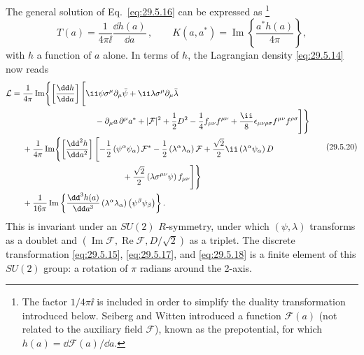 The general solution of Eq.~\eqref{eq:29.5.16} can be expressed as
\footnote{The factor \(1/4\pi \ii\) is included in order to simplify the
duality transformation introduced below. Seiberg and Witten introduced a
function \(\mathcal{F}(a)\) (not related to the auxiliary field
\(\mathcal{F}\)), known as the prepotential, for which
\(h(a)=\dd\mathcal{F}(a)/\dd a\).}
\begin{equation}
  T(a)=\frac{1}{4\pi \ii}\frac{\dd h(a)}{\dd a}\,,
  \qquad
  K(a,a^*)=\operatorname{Im}\left\{\frac{a^*h(a)}{4\pi}\right\},
  \tag{29.5.19}\label{eq:29.5.19}
\end{equation}
with \(h\) a function of \(a\) alone. In terms of \(h\), the Lagrangian
density \eqref{eq:29.5.14} now reads
\begin{equation}
  \begin{aligned}
  \mathcal{L}
  ={}&\frac{1}{4\pi}\operatorname{Im}\Biggl\{
    \left[\frac{\dd h}{\dd a}\right]\Biggl[
      \ii\psi\sigma^\mu\partial_\mu\bar\psi
      +\ii\lambda\sigma^\mu\partial_\mu\bar\lambda
  \\
  &\hspace{31mm}
      -\partial_\mu a\,\partial^\mu a^*
      +\lvert\mathcal{F}\rvert^2+\frac12D^2
      -\frac14f_{\mu\nu}f^{\mu\nu}
      +\frac{\ii}{8}\epsilon_{\mu\nu\rho\sigma}
        f^{\mu\nu}f^{\rho\sigma}
    \Biggr]\Biggr\}
  \\
  &+\frac{1}{4\pi}\operatorname{Im}\Biggl\{
    \left[\frac{\dd^2h}{\dd a^2}\right]\Biggl[
      -\frac12\left(\psi^\alpha\psi_\alpha\right)\mathcal{F}^*
      -\frac12\left(\lambda^\alpha\lambda_\alpha\right)\mathcal{F}
      +\frac{\sqrt{2}}{2}\ii\left(\lambda^\alpha\psi_\alpha\right)D
  \\
  &\hspace{43mm}
      +\frac{\sqrt{2}}{2}
        \left(\lambda\sigma^{\mu\nu}\psi\right)f_{\mu\nu}
    \Biggr]\Biggr\}
  \\
  &+\frac{1}{16\pi}\operatorname{Im}\left\{
    \frac{\dd^3h(a)}{\dd a^3}
    \left(\lambda^\alpha\lambda_\alpha\right)
    \left(\psi^\beta\psi_\beta\right)
  \right\}.
  \end{aligned}
  \tag{29.5.20}\label{eq:29.5.20}
\end{equation}
This is invariant under an \(SU(2)\) \(R\)-symmetry, under which
\((\psi,\lambda)\) transforms as a doublet and
\((\operatorname{Im}\mathcal{F},\operatorname{Re}\mathcal{F},D/\sqrt{2})\)
as a triplet. The discrete transformation \eqref{eq:29.5.15},
\eqref{eq:29.5.17}, and \eqref{eq:29.5.18} is a finite element of this
\(SU(2)\) group: a rotation of \(\pi\) radians around the 2-axis.

